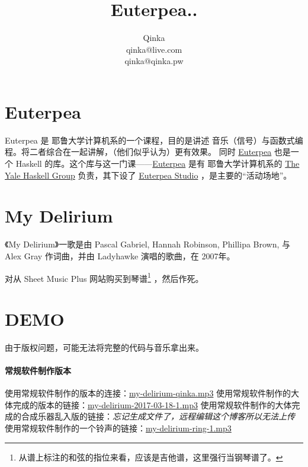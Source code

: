 \documentclass{ctexart}
\author{Qinka \\ qinka@live.com \\ qinka@qinka.pw}
\title{Euterpea..}
\begin{document}
\section{Euterpea}

Euterpea 是 耶鲁大学计算机系的一个课程，目的是讲述 音乐（信号）与函数式编程。将二者综合在一起讲解，（他们似乎认为）更有效果。
同时 \href{http://www.euterpea.com}{Euterpea} 也是一个 Haskell 的库。这个库与这一门课——\href{http://haskell.cs.yale.edu/euterpea/}{Euterpea}
是有 耶鲁大学计算机系的 \href{http://haskell.cs.yale.edu}{The Yale Haskell Group} 负责，其下设了
\href{http://haskell.cs.yale.edu/euterpea/euterpea-studio/}{Euterpea Studio} ，是主要的“活动场地”。

\section{My Delirium}

《My Delirium》一歌是由 Pascal Gabriel, Hannah Robinson, Phillipa Brown, 与 Alex Gray 作词曲，并由 Ladyhawke 演唱的歌曲，在 2007年。

对从 Sheet Music Plus 网站购买到琴谱\footnote{从谱上标注的和弦的指位来看，应该是吉他谱，这里强行当钢琴谱了。} ，然后作死。


\section{DEMO}

由于版权问题，可能无法将完整的代码与音乐拿出来。

\paragraph{常规软件制作版本}
使用常规软件制作的版本的连接：\href{/res/music/my-delirium-qinka.mp3}{my-delirium-qinka.mp3}
使用常规软件制作的大体完成的版本的链接：\href{/res/music/my-delirium-2017-03-18-1.mp3}{my-delirium-2017-03-18-1.mp3}
使用常规软件制作的大体完成的合成乐器乱入版的链接：\textit{忘记生成文件了，远程编辑这个博客所以无法上传}
使用常规软件制作的一个铃声的链接：\href{/res/music/my-delirium-ring-1.mp3}{my-delirium-ring-1.mp3}
\end{document}
